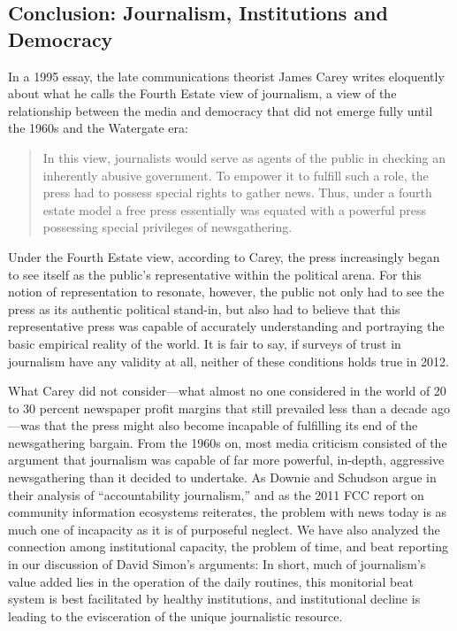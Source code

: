 \subsection{Conclusion: Journalism, Institutions and Democracy}
In a 1995 essay, the late communications theorist James Carey writes eloquently
about what he calls the Fourth Estate view of journalism, a view of the relationship
between the media and democracy that did not emerge fully until the 1960s
and the Watergate era:

\begin{quote}In this view, journalists would serve as agents of the public in checking
an inherently abusive government. To empower it to fulfill such a
role, the press had to possess special rights to gather news. Thus, under a
fourth estate model a free press essentially was equated with a powerful
press possessing special privileges of newsgathering.
\end{quote}

Under the Fourth Estate view, according to Carey, the press increasingly began to
see itself as the public’s representative within the political arena. For this notion of
representation to resonate, however, the public not only had to see the press as its
authentic political stand-in, but also had to believe that this representative press
was capable of accurately understanding and portraying the basic empirical reality
of the world. It is fair to say, if surveys of trust in journalism have any validity
at all, neither of these conditions holds true in 2012.

What Carey did not consider—what almost no one considered in the world of
20 to 30 percent newspaper profit margins that still prevailed less than a decade
ago—was that the press might also become incapable of fulfilling its end of the
newsgathering bargain. From the 1960s on, most media criticism consisted of the
argument that journalism was capable of far more powerful, in-depth, aggressive
newsgathering than it decided to undertake. As Downie and Schudson argue
in their analysis of ``accountability journalism,'' and as the 2011 FCC report on
community information ecosystems reiterates, the problem with news today is as
much one of incapacity as it is of purposeful neglect. We have also analyzed the
connection among institutional capacity, the problem of time, and beat reporting
in our discussion of David Simon’s arguments: In short, much of journalism’s
value added lies in the operation of the daily routines, this monitorial beat system
is best facilitated by healthy institutions, and institutional decline is leading to the
evisceration of the unique journalistic resource.


